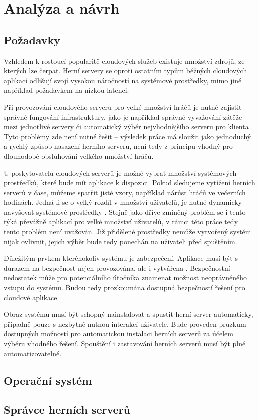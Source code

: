 \chapter[Analýza a návrh]{Analýza a návrh}

\section{Požadavky}

Vzhledem k rostoucí popularitě cloudových služeb \cite{statista_cloud_revenue} existuje množství zdrojů, ze kterých lze čerpat.
Herní servery se oproti ostatním typům běžných cloudových aplikací odlišují svojí vysokou náročností
na systémové prostředky, mimo jiné například požadavkem na nízkou latenci.

Při provozování cloudového serveru pro velké množství hráčů je nutné zajistit správné fungování infrastruktury,
jako je například správné vyvažování zátěže mezi jednotlivé servery či automatický výběr nejvhodnějšího serveru
pro klienta \cite{building_cloud_mog_server}. Tyto problémy zde není nutné řešit -- výsledek práce má sloužit jako jednoduchý a rychlý
způsob nasazení herního serveru, není tedy z principu vhodný pro dlouhodobé obsluhování velkého množství hráčů.

U poskytovatelů cloudových serverů je možné vybrat množství systémových prostředků, které bude mít aplikace k dispozici.
Pokud sledujeme vytížení herních serverů v čase, můžeme spatřit jisté vzory, například nárůst hráčů ve večerních hodinách.
Jedná-li se o velký rozdíl v množství uživatelů, je nutné dynamicky navyšovat systémové prostředky \cite{efficient_resources}.
Stejně jako dříve zmíněný problém se i tento týká převážně aplikací pro velké množství uživatelů, v rámci této práce tedy tento problém není uvažován.
Již přidělené prostředky nemůže vytvořený systém nijak ovlivnit, jejich výběr bude tedy ponechán na uživateli před spuštěním.

Důležitým prvkem kteréhokoliv systému je zabezpečení. Aplikace musí být s důrazem na bezpečnost nejen provozována,
ale i vytvářena \cite{newcombe_2012}. Bezpečnostní nedostatek může pro potenciálního útočníka znamenat možnost neoprávněného vstupu do systému.
Budou tedy prozkoumána dostupná bezpečností řešení pro cloudové aplikace.

Obraz systému musí být schopný nainstalovat a spustit herní server automaticky, případně pouze s nezbytně nutnou interakcí uživatele.
Bude proveden průzkum dostupných možností pro automatickou instalaci herních serverů za účelem výběru vhodného řešení.
Spouštění i zastavování herních serverů musí být plně automatizovatelné.

\section{Operační systém}

\section{Správce herních serverů}
